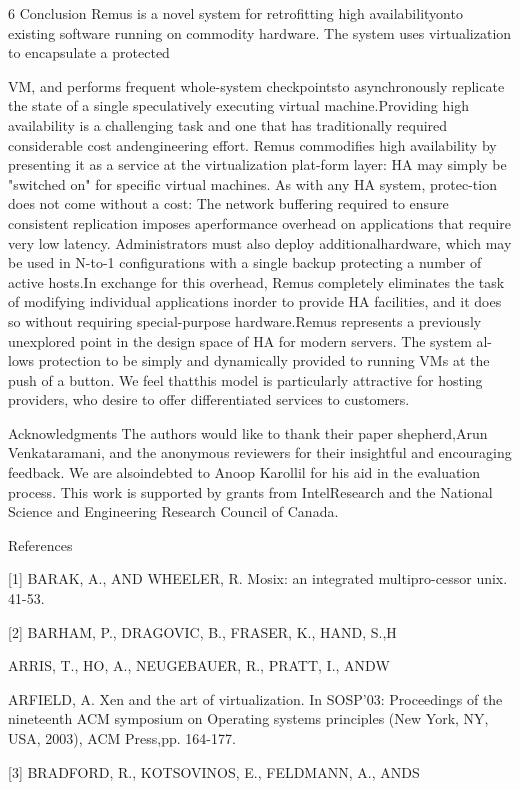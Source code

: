 6 Conclusion
Remus is a novel system for retrofitting high availabilityonto existing software running on commodity hardware.
The system uses virtualization to encapsulate a protected

VM, and performs frequent whole-system checkpointsto asynchronously replicate the state of a single speculatively executing virtual machine.Providing high availability is a challenging task and
one that has traditionally required considerable cost andengineering effort. Remus commodifies high availability by presenting it as a service at the virtualization plat-form layer: HA may simply be "switched on" for specific virtual machines. As with any HA system, protec-tion does not come without a cost: The network buffering required to ensure consistent replication imposes aperformance overhead on applications that require very
low latency. Administrators must also deploy additionalhardware, which may be used in N-to-1 configurations
with a single backup protecting a number of active hosts.In exchange for this overhead, Remus completely eliminates the task of modifying individual applications inorder to provide HA facilities, and it does so without requiring special-purpose hardware.Remus represents a previously unexplored point in the
design space of HA for modern servers. The system al-lows protection to be simply and dynamically provided
to running VMs at the push of a button. We feel thatthis model is particularly attractive for hosting providers,
who desire to offer differentiated services to customers.

Acknowledgments
The authors would like to thank their paper shepherd,Arun Venkataramani, and the anonymous reviewers for
their insightful and encouraging feedback. We are alsoindebted to Anoop Karollil for his aid in the evaluation
process. This work is supported by grants from IntelResearch and the National Science and Engineering Research Council of Canada.

References

[1] BARAK, A., AND WHEELER, R. Mosix: an integrated multipro-cessor unix. 41-53.

[2] BARHAM, P., DRAGOVIC, B., FRASER, K., HAND, S.,H

ARRIS, T., HO, A., NEUGEBAUER, R., PRATT, I., ANDW

ARFIELD, A. Xen and the art of virtualization. In SOSP'03: Proceedings of the nineteenth ACM symposium on Operating systems principles (New York, NY, USA, 2003), ACM Press,pp. 164-177.

[3] BRADFORD, R., KOTSOVINOS, E., FELDMANN, A., ANDS

